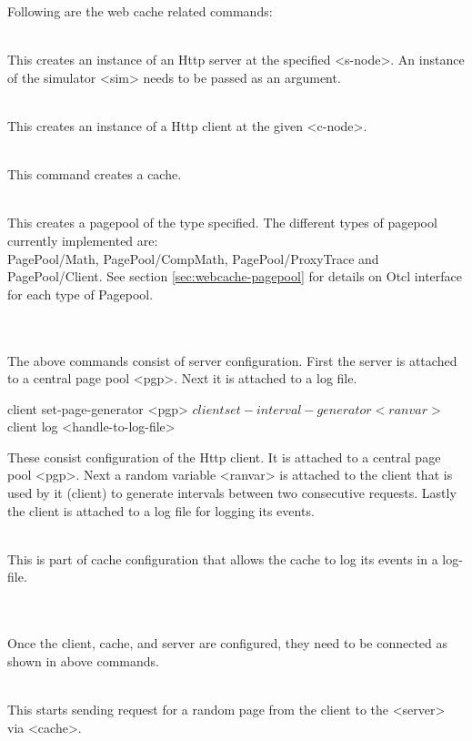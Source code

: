 Following are the web cache related commands:
\begin{flushleft}
\\
This creates an instance of an Http server at the specified <s-node>. An
instance of the simulator <sim> needs to be passed as an argument.


\\
This creates an instance of a Http client at the given <c-node>.


\code{set cache [new Http/Cache <sim> <e-node>}\\
This command creates a cache.


\\
This creates a pagepool of the type specified. The different types of pagepool
currently implemented are:\\
PagePool/Math, PagePool/CompMath, PagePool/ProxyTrace and PagePool/Client.
See section \ref{sec:webcache-pagepool} for details on Otcl interface for
each type of Pagepool.


\\
\\
The above commands consist of server configuration. First the server is
attached to a central page pool <pgp>. Next it is attached to a log file.


\begin{program}
client set-page-generator <pgp>
$client set-interval-generator <ranvar> 
$client log <handle-to-log-file>
\end{program}
These consist configuration of the Http client. It is attached to a central
page pool <pgp>. Next a random variable <ranvar> is attached to the client
that is used by it (client) to generate intervals between two consecutive
requests. Lastly the client is attached to a log file for logging its events.


\\
This is part of cache configuration that allows the cache to log its
events in a log-file. 


\\
\\
Once the client, cache, and server are configured, they need to be
connected as shown in above commands.


\\
This starts sending request for a random page from the client to the
<server> via <cache>.

\end{flushleft}
\endinput


